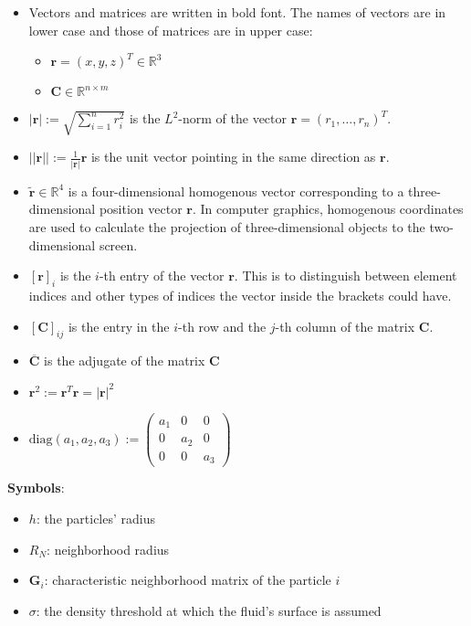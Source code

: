 \begin{itemize}
    \item Vectors and matrices are written in bold font. The names of vectors are in lower case and those of matrices are in upper case:
        \begin{itemize}
            \item $\textbf{r} = (x, y, z)^T \in \mathbb{R}^3$
            \item $\textbf{C} \in \mathbb{R}^{n \times m}$
        \end{itemize}
        
    \item $| \textbf{r} | := \sqrt{ \sum_{i=1}^n r_i^2 }$ is the $L^2$-norm of the vector $\textbf{r} = ( r_1, \dots, r_n )^T$.
    \item $|| \textbf{r} || := \frac{1}{|\textbf{r}|} \textbf{r}$ is the unit vector pointing in the same direction as $\textbf{r}$.
    \item $\tilde{\textbf{r}} \in \mathbb{R}^4$ is a four-dimensional homogenous vector corresponding to a three-dimensional position vector $\textbf{r}$. In computer graphics, homogenous coordinates are used to calculate the projection of three-dimensional objects to the two-dimensional screen.
    \item $[\textbf{r}]_i$ is the $i$-th entry of the vector $\textbf{r}$. This is to distinguish between element indices and other types of indices the vector inside the brackets could have.
    \item $[\textbf{C}]_{ij}$ is the entry in the $i$-th row and the $j$-th column of the matrix $\textbf{C}$.
    \item $\overline{\textbf{C}}$ is the adjugate of the matrix $\textbf{C}$
    \item $\textbf{r}^2 := \textbf{r}^T \textbf{r} = |\textbf{r}|^2$
    \item $\text{diag}(a_1, a_2, a_3) := \begin{pmatrix} a_1&0&0\\0&a_2&0\\0&0&a_3 \end{pmatrix}$
\end{itemize}

\textbf{Symbols}:

\begin{itemize}
    \item $h$: the particles' radius
    \item $R_{N}$: neighborhood radius
    \item $\textbf{G}_i$: characteristic neighborhood matrix of the particle $i$
    \item $\sigma$: the density threshold at which the fluid's surface is assumed
\end{itemize}
